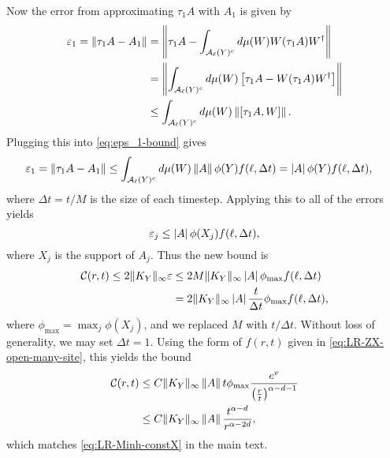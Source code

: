 Now the error from approximating $\tau_1 A$ with $A_1$ is given by
\begin{align}
    \varepsilon_1 =\left\|\tau_1 A - A_1\right\|
    &= \left\|\tau_1 A - \int_{\mathcal A_\ell(Y)^c} d\mu(W) W (\tau_1 A) W^\dag\right\|\\
    &= \left\|\int_{\mathcal A_\ell(Y)^c} d\mu(W) \left[\tau_1 A - W (\tau_1 A) W^\dag\right]\right\|\\
    &\leq \int_{\mathcal A_\ell(Y)^c} d \mu (W) \left\|\left[\tau_1 A,W\right]\right\|.
    \label{eq:eps_1-bound}
\end{align}
Plugging this into \cref{eq:eps_1-bound} gives
\begin{align}
  \varepsilon_1 &= \left\|\tau_1 A - A_1\right\| \le  \int_{\mathcal A_\ell(Y)^c} d \mu (W) \left\|A\right\|\phi(Y)f(\ell,\Delta t)
  = \left | A \right|\phi(Y) f(\ell,\Delta t),
\end{align}
where $\Delta t = t/M$ is the size of each timestep.
Applying this to all of the errors yields
\begin{equation}
  \varepsilon_j \le \left | A \right| \phi(X_j)f(\ell,\Delta t),
\end{equation}
where $X_j$ is the support of $A_j$.
Thus the new bound is
\begin{align}
 \mathcal C(r,t) \le 2\|K_Y\|_{\infty} \varepsilon &\le 2M\|K_Y\|_{\infty}\left | A \right| \phi_\text{max}f(\ell,\Delta t)\\
 &= 2 \|K_Y\|_{\infty}\left | A \right|\frac{t}{\Delta t}\phi_\text{max}f(\ell,\Delta t),
\end{align}
where $\phi_\text{max} = \max_j \phi(X_j)$, and we replaced $M$ with $t/\Delta t$.
Without loss of generality, we may set $\Delta t = 1$.
Using the form of $f(r,t)$ given in \cref{eq:LR-ZX-open-many-site}, this yields the bound
\begin{align}
   \mathcal C(r,t) &\le C \|K_Y\|_{\infty} \left\|A\right\| t \phi_{\max} \frac{e^v}{\left(\frac rt\right)^{\alpha-d-1}} \\
   &\le C \|K_Y\|_{\infty} \left\|A\right\| \frac{t^{\alpha-d}}{r^{\alpha-2d}},
\end{align}
which matches \cref{eq:LR-Minh-constX} in the main text.

